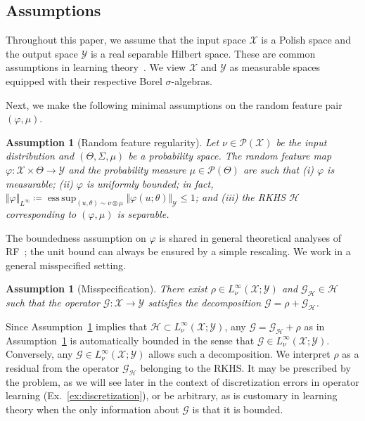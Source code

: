 \documentclass{article}
\theoremstyle{plain}
\newtheorem{assumption}[theorem]{Assumption}
\theoremstyle{my_def}
\theoremstyle{my_rem}
\numberwithin{equation}{section}
\numberwithin{theorem}{section}%
\newcommand{\scrP}{\mathscr{P}}
\newcommand{\cG}{\mathcal{G}}
\newcommand{\cH}{\mathcal{H}}
\newcommand{\cX}{\mathcal{X}}
\newcommand{\cY}{\mathcal{Y}}
\newcommand{\defeq}{\coloneqq} %
\DeclareMathOperator*{\esssup}{ess\,sup}
\newcommand{\GH}{\cG_{\cH}}
\renewcommand{\phi}{\varphi}
\begin{document}
\subsection{Assumptions}\label{sec:main_assump}
Throughout this paper, we assume that the input space $\cX$ is a Polish space and the output space $\cY$ is a real separable Hilbert space. These are common assumptions in learning theory~\cite{caponnetto2007optimal}. We view $\cX$ and $\cY$ as measurable spaces equipped with their respective Borel $\sigma$-algebras.

Next, we make the following minimal assumptions on the random feature pair $(\phi,\mu)$.
\begin{assumption}[Random feature regularity]\label{ass:rf}
Let $\nu\in\scrP(\cX)$ be the input distribution and $(\Theta, \Sigma, \mu)$ be a probability space. The random feature map $\phi\colon \cX \times \Theta \to \cY$ and the probability measure $\mu\in\scrP(\Theta)$ are such that (i) $\phi$ is measurable; (ii) $\phi$ is uniformly bounded; in fact, $\Vert \phi \Vert_{L^\infty} \defeq \esssup_{(u,\theta)\sim \nu\otimes \mu} \Vert \phi(u;\theta)\Vert_{\cY} \le 1$; and (iii) the RKHS $\cH$ corresponding to $(\phi,\mu)$ is separable.
\end{assumption}
The boundedness assumption on $\phi$ is shared in general theoretical analyses of RF~\cite{li2021towards,RR2008,rudi2017generalization}; the unit bound can always be ensured by a simple rescaling. We work in a general misspecified setting.
\begin{assumption}[Misspecification]\label{ass:misspec}
There exist $\rho\in L^\infty_\nu(\cX;\cY)$ and $\GH\in\cH$ such that the operator $\cG\colon\cX\to\cY$ satisfies the decomposition $\cG=\rho + \GH$.
\end{assumption}
Since Assumption~\ref{ass:rf} implies that $\cH \subset L^\infty_\nu(\cX;\cY)$, any $\cG = \cG_\cH + \rho$ as in Assumption~\ref{ass:misspec} is automatically bounded in the sense that $\cG \in L^\infty_\nu(\cX;\cY)$. Conversely, any $\cG \in L^\infty_\nu(\cX;\cY)$ allows such a decomposition. We interpret $\rho$ as a residual from the operator $\GH$ belonging to the RKHS. It may be prescribed by the problem, as we will see later in the context of discretization errors in operator learning (Ex.~\ref{ex:discretization}), or be arbitrary, as is customary in learning theory when the only information about $\cG$ is that it is bounded.
\end{document}
